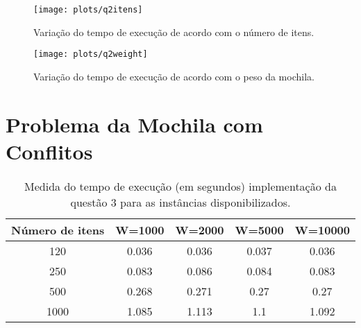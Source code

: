 \documentclass[a4paper]{article}
\begin{document}
\begin{figure}[H]
\centering
\texttt{[image: plots/q2itens]}
\caption{Variação do tempo de execução de acordo com o número de itens.}
\label{fig:q2:itens}
\end{figure}

\begin{figure}[H]
\centering
\texttt{[image: plots/q2weight]}
\caption{Variação do tempo de execução de acordo com o peso da mochila.}
\label{fig:q2:weight}
\end{figure}

\section{Problema da Mochila com Conflitos}

\begin{table}[H]
\centering
\begin{tabular}{c|c|c|c|c}
Número de itens & W=1000 & W=2000 & W=5000 & W=10000 \\
\hline
120 & 0.036	 & 0.036	 & 0.037	 & 0.036	 \\
250 & 0.083	 & 0.086	 & 0.084	 & 0.083	 \\
500 & 0.268	 & 0.271	 & 0.27	 & 0.27	 \\
1000 & 1.085	 & 1.113	 & 1.1	 & 1.092	 \\
\end{tabular}
\caption{Medida do tempo de execução (em segundos) implementação da questão 3 para as instâncias disponibilizados.}
\label{tab:q3:bench}
\end{table}
\end{document}
